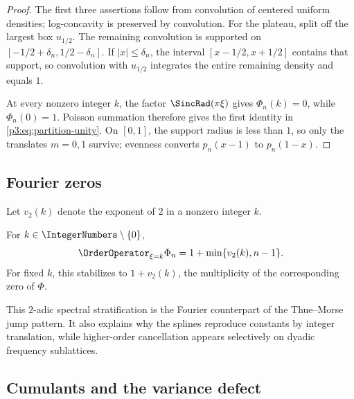 \documentclass[11pt,oneside]{article}
\numberwithin{equation}{section}
\theoremstyle{definition}
\theoremstyle{remark}
\begin{document}
\begin{proof}
The first three assertions follow from convolution of centered uniform densities;
log-concavity is preserved by convolution.  For the plateau, split off the largest box
$u_{1/2}$.  The remaining convolution is supported on
$[-1/2+\delta_n,1/2-\delta_n]$.  If $|x|\le\delta_n$, the interval
$[x-1/2,x+1/2]$ contains that support, so convolution with $u_{1/2}$ integrates the
entire remaining density and equals $1$.

At every nonzero integer $k$, the factor $\SincRad(\pi\xi)$ gives $\Phi_n(k)=0$, while
$\Phi_n(0)=1$.  Poisson summation therefore gives the first identity in
\cref{p3:eq:partition-unity}.  On $[0,1]$, the support radius is less than $1$, so only the
translates $m=0,1$ survive; evenness converts $p_n(x-1)$ to $p_n(1-x)$.
\end{proof}

\subsection{Fourier zeros}

Let $v_2(k)$ denote the exponent of $2$ in a nonzero integer $k$.

\begin{proposition}
\label{p3:prop:zero-multiplicity}
For $k\in\IntegerNumbers\setminus\{0\}$,
\begin{equation}
 \OrderOperator_{\xi=k}\Phi_n
 =1+\min\{v_2(k),n-1\}.
 \label{p3:eq:zero-multiplicity}
\end{equation}
For fixed $k$, this stabilizes to $1+v_2(k)$, the multiplicity of the corresponding
zero of $\Phi$.
\end{proposition}

This $2$-adic spectral stratification is the Fourier counterpart of the Thue--Morse
jump pattern.  It also explains why the splines reproduce constants by integer
translation, while higher-order cancellation appears selectively on dyadic frequency
sublattices.

\subsection{Cumulants and the variance defect}
\end{document}
